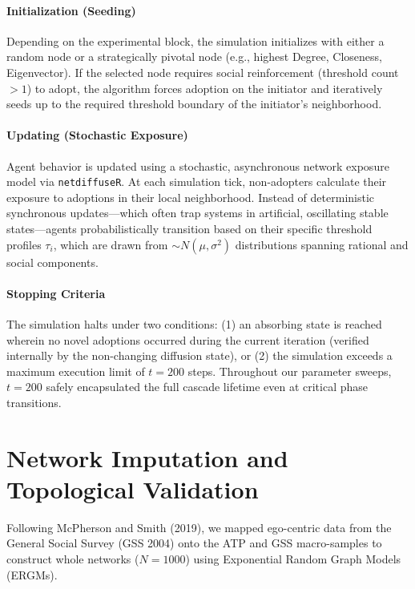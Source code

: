 \documentclass[11pt,a4paper]{article}
\begin{document}
\paragraph{Initialization (Seeding)} 
Depending on the experimental block, the simulation initializes with either a random node or a strategically pivotal node (e.g., highest Degree, Closeness, Eigenvector). If the selected node requires social reinforcement (threshold count $>1$) to adopt, the algorithm forces adoption on the initiator and iteratively seeds up to the required threshold boundary of the initiator's neighborhood.

\paragraph{Updating (Stochastic Exposure)}
Agent behavior is updated using a stochastic, asynchronous network exposure model via \texttt{netdiffuseR}. At each simulation tick, non-adopters calculate their exposure to adoptions in their local neighborhood. Instead of deterministic synchronous updates---which often trap systems in artificial, oscillating stable states---agents probabilistically transition based on their specific threshold profiles $\tau_i$, which are drawn from $\sim N(\mu, \sigma^2)$ distributions spanning rational and social components.

\paragraph{Stopping Criteria}
The simulation halts under two conditions: (1) an absorbing state is reached wherein no novel adoptions occurred during the current iteration (verified internally by the non-changing diffusion state), or (2) the simulation exceeds a maximum execution limit of $t=200$ steps. Throughout our parameter sweeps, $t=200$ safely encapsulated the full cascade lifetime even at critical phase transitions.

\newpage
\newpage
\section{Network Imputation and Topological Validation}

Following McPherson and Smith (2019), we mapped ego-centric data from the General Social Survey (GSS 2004) onto the ATP and GSS macro-samples to construct whole networks ($N=1000$) using Exponential Random Graph Models (ERGMs). 
\end{document}
